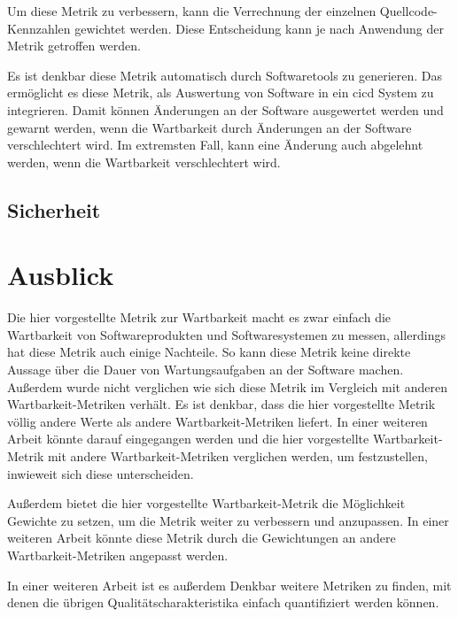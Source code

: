 \documentclass[12pt, a4paper, ngerman]{article}
\begin{document}
Um diese Metrik zu verbessern,
kann die Verrechnung der einzelnen Quellcode-Kennzahlen
gewichtet werden.
Diese Entscheidung kann je nach Anwendung der Metrik getroffen werden.

Es ist denkbar diese Metrik automatisch durch
Softwaretools zu generieren.
Das ermöglicht es diese Metrik, als Auswertung von Software
in ein \ac{cicd} System zu integrieren.
Damit können Änderungen an der Software ausgewertet werden
und gewarnt werden, wenn die Wartbarkeit durch Änderungen an der Software verschlechtert wird.
Im extremsten Fall, kann eine Änderung auch abgelehnt werden, wenn die Wartbarkeit verschlechtert wird.

\subsection{Sicherheit}


\section{Ausblick}

Die hier vorgestellte Metrik zur Wartbarkeit macht es zwar einfach
die Wartbarkeit von Softwareprodukten und Softwaresystemen
zu messen, allerdings hat diese Metrik auch einige Nachteile.
So kann diese Metrik keine direkte Aussage über die Dauer 
von Wartungsaufgaben an der Software machen.
Außerdem wurde nicht verglichen wie sich diese Metrik 
im Vergleich mit anderen Wartbarkeit-Metriken verhält.
Es ist denkbar, dass die hier vorgestellte Metrik
völlig andere Werte als andere Wartbarkeit-Metriken liefert.
In einer weiteren Arbeit könnte darauf eingegangen werden
und die hier vorgestellte Wartbarkeit-Metrik
mit andere Wartbarkeit-Metriken verglichen werden,
um festzustellen, inwieweit sich diese unterscheiden.

Außerdem bietet die hier vorgestellte Wartbarkeit-Metrik 
die Möglichkeit Gewichte zu setzen, 
um die Metrik weiter zu verbessern und anzupassen.
In einer weiteren Arbeit könnte diese Metrik durch
die Gewichtungen an andere Wartbarkeit-Metriken angepasst werden.

In einer weiteren Arbeit ist es außerdem Denkbar weitere Metriken zu finden,
mit denen die übrigen Qualitätscharakteristika 
einfach quantifiziert werden können.



\newpage
\printbibliography
\end{document}
